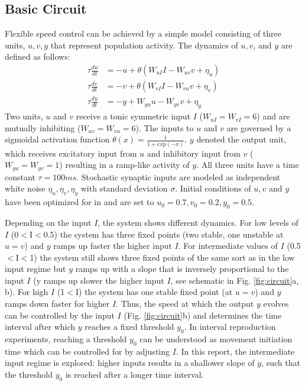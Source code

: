 \documentclass[9pt]{article}
\begin{document}
\subsection{Basic Circuit}
Flexible speed control can be achieved by a simple model consisting of three units, $u, v, y$ that represent population activity. 
The dynamics of $u, v$, and $y$ are defined as follows:
\begin{equation} \label{circuit}
	\begin{split}
	\tau\frac{du}{dt} & = -u + \theta(W_{uI}I - W_{uv}v + \eta_u) \\
	\tau\frac{dv}{dt} & = -v + \theta(W_{vI}I - W_{vu}v + \eta_v) \\
	\tau\frac{dy}{dt} & = -y + W_{yu}u - W_{yv}v + \eta_y
	\end{split}
\end{equation}
Two units, $u$ and $v$ receive a tonic symmetric input $I$ ($W_{uI}=W_{vI}=6$) and are mutually inhibiting ($W_{uv}=W_{vu}=6$). 
The inputs to $u$ and $v$ are governed by a sigmoidal activation function $\theta(x) = \frac{1}{1+exp(-x)}$.
$y$ denoted the output unit, which receives excitatory input from $u$ and inhibitory input from $v$ ($W_{yu}=W_{yv}=1$) resulting in a ramp-like activity of $y$.
All three units have a time constant $\tau = 100 ms$. 
Stochastic synaptic inputs are modeled as independent white noise $\eta_u, \eta_v, \eta_y$ with standard deviation $\sigma$.
Initial conditions of $u, v$ and $y$ have been optimized for in \cite{Egger2020} and are set to $u_0=0.7 , v_0=0.2 , y_0=0.5$.

Depending on the input $I$, the system shows different dynamics. For low levels of $I$ (0$<$I$<$0.5) the system has three fixed points (two stable, one unstable at $u=v$) and $y$ ramps up faster the higher input $I$. 
For intermediate values of $I$ (0.5$<$I$<$1) the system still shows three fixed points of the same sort as in the low input regime but $y$ ramps up with a slope that is inversely proportional to the input $I$ (y ramps up slower the higher input $I$, see schematic in Fig. \ref{fig:circuit}a, b). 
For high $I$ (1$<$I) the system has one stable fixed point (at $u=v$) and $y$ ramps down faster for higher $I$.
Thus, the speed at which the output $y$ evolves can be controlled by the input $I$ (Fig. \ref{fig:circuit}b) and determines the time interval after which $y$ reaches a fixed threshold $y_0$. 
In interval reproduction experiments, reaching a threshold $y_0$ can be understood as movement initiation time which can be controlled for by adjusting $I$.
In this report, the intermediate input regime is explored: higher inputs results in a shallower slope of $y$, such that the threshold $y_0$ is reached after a longer time interval.
\end{document}

